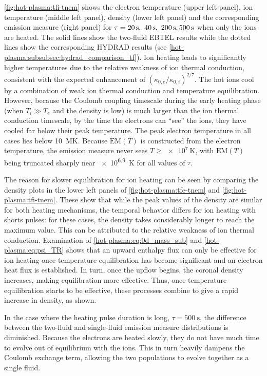 \autoref{fig:hot-plasma:tfi-tnem} shows the electron temperature (upper left panel), ion temperature (middle left panel), density (lower left panel) and the corresponding emission measure (right panel) for $\tau=\SIlist[list-final-separator = {,}]{20;40;200;500}{\second}$ when only the ions are heated. The solid lines show the two-fluid EBTEL results while the dotted lines show the corresponding HYDRAD results (see \autoref{hot-plasma:subsubsec:hydrad_comparison_tf}). Ion heating leads to significantly higher temperatures due to the relative weakness of ion thermal conduction, consistent with the expected enhancement of $(\kappa_{0,e}/\kappa_{0,i})^{2/7}$. The hot ions cool by a combination of weak ion thermal conduction and temperature equilibration. However, because the Coulomb coupling timescale during the early heating phase (when $T_i\gg T_e$ and the density is low) is much larger than the ion thermal conduction timescale, by the time the electrons can ``see'' the ions, they have cooled far below their peak temperature. The peak electron temperature in all cases lies below \SI{10}{\mega\kelvin}. Because $\mathrm{EM}(T)$ is constructed from the electron temperature, the emission measure never sees $T\ge\SI{e7}{\kelvin}$, with $\mathrm{EM}(T)$ being truncated sharply near \SI{e6.9}{\kelvin} for all values of $\tau$.

The reason for slower equilibration for ion heating can be seen by comparing the density plots in the lower left panels of \autoref{fig:hot-plasma:tfe-tnem} and \autoref{fig:hot-plasma:tfi-tnem}. These show that while the peak values of the density are similar for both heating mechanisms, the temporal behavior differs for ion heating with shorts pulses: for these cases, the density takes considerably longer to reach the maximum value. This can be attributed to the relative weakness of ion thermal conduction. Examination of \autoref{hot-plasma:eq:0d_mass_sub} and \autoref{hot-plasma:eq:psi_TR} shows that an upward enthalpy flux can only be effective for ion heating once temperature equilibration has become significant and an electron heat flux is established. In turn, once the upflow begins, the coronal density increases, making equilibration more effective. Thus, once temperature equilibration starts to be effective, these processes combine to give a rapid increase in density, as shown.

In the case where the heating pulse duration is long, $\tau=\SI{500}{\second}$, the difference between the two-fluid and single-fluid emission measure distributions is diminished. Because the electrons are heated slowly, they do not have much time to evolve out of equilibrium with the ions. This in turn heavily dampens the Coulomb exchange term, allowing the two populations to evolve together as a single fluid.

